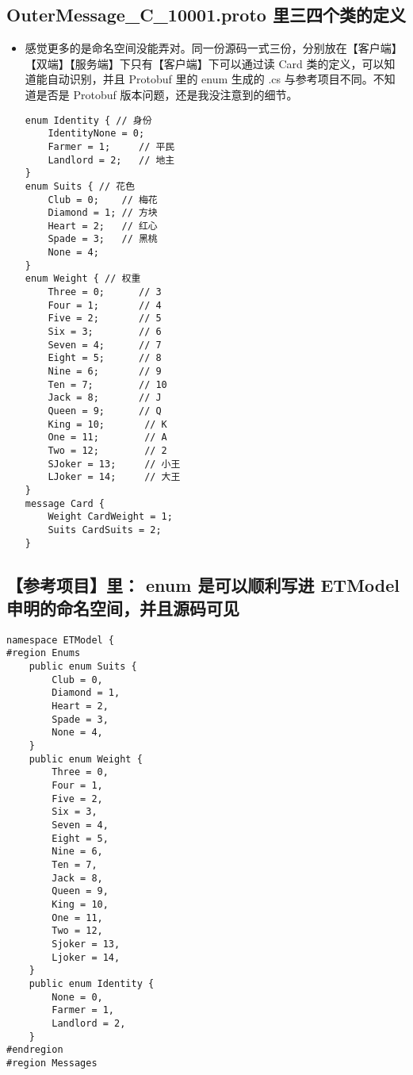 \documentclass[9pt, b5paper]{article}
\begin{document}
\subsection{OuterMessage\_C\_10001.proto 里三四个类的定义}
\label{sec-3-1}
\begin{itemize}
\item 感觉更多的是命名空间没能弄对。同一份源码一式三份，分别放在【客户端】【双端】【服务端】下只有【客户端】下可以通过读 Card 类的定义，可以知道能自动识别，并且 Protobuf 里的 enum 生成的 .cs 与参考项目不同。不知道是否是 Protobuf 版本问题，还是我没注意到的细节。
\begin{verbatim}
enum Identity { // 身份
    IdentityNone = 0;
    Farmer = 1;     // 平民
    Landlord = 2;   // 地主
}
enum Suits { // 花色
    Club = 0;    // 梅花
    Diamond = 1; // 方块
    Heart = 2;   // 红心
    Spade = 3;   // 黑桃
    None = 4;
}
enum Weight { // 权重
    Three = 0;      // 3
    Four = 1;       // 4
    Five = 2;       // 5
    Six = 3;        // 6
    Seven = 4;      // 7
    Eight = 5;      // 8
    Nine = 6;       // 9
    Ten = 7;        // 10
    Jack = 8;       // J
    Queen = 9;      // Q
    King = 10;       // K
    One = 11;        // A
    Two = 12;        // 2
    SJoker = 13;     // 小王
    LJoker = 14;     // 大王
}
message Card {
    Weight CardWeight = 1;
    Suits CardSuits = 2;
}
\end{verbatim}
\end{itemize}
\subsection{【参考项目】里： enum 是可以顺利写进 ETModel 申明的命名空间，并且源码可见}
\label{sec-3-2}
\begin{verbatim}
namespace ETModel {
#region Enums
    public enum Suits {
        Club = 0,
        Diamond = 1,
        Heart = 2,
        Spade = 3,
        None = 4,
    }
    public enum Weight {
        Three = 0,
        Four = 1,
        Five = 2,
        Six = 3,
        Seven = 4,
        Eight = 5,
        Nine = 6,
        Ten = 7,
        Jack = 8,
        Queen = 9,
        King = 10,
        One = 11,
        Two = 12,
        Sjoker = 13,
        Ljoker = 14,
    }
    public enum Identity {
        None = 0,
        Farmer = 1,
        Landlord = 2,
    }
#endregion
#region Messages
\end{verbatim}
\end{document}
